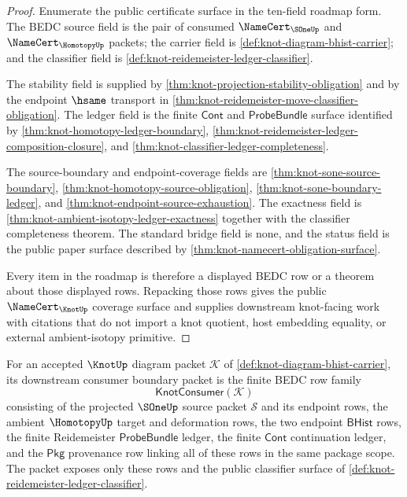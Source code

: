 \begin{proof}
Enumerate the public certificate surface in the ten-field roadmap form. The
BEDC source field is the pair of consumed $\NameCert_{\SOneUp}$ and
$\NameCert_{\HomotopyUp}$ packets; the carrier field is
\autoref{def:knot-diagram-bhist-carrier}; and the classifier field is
\autoref{def:knot-reidemeister-ledger-classifier}.

The stability field is supplied by
\autoref{thm:knot-projection-stability-obligation} and by the endpoint
$\hsame$ transport in
\autoref{thm:knot-reidemeister-move-classifier-obligation}. The ledger field
is the finite $\mathsf{Cont}$ and $\mathsf{ProbeBundle}$ surface identified by
\autoref{thm:knot-homotopy-ledger-boundary},
\autoref{thm:knot-reidemeister-ledger-composition-closure}, and
\autoref{thm:knot-classifier-ledger-completeness}.

The source-boundary and endpoint-coverage fields are
\autoref{thm:knot-sone-source-boundary},
\autoref{thm:knot-homotopy-source-obligation},
\autoref{thm:knot-sone-boundary-ledger}, and
\autoref{thm:knot-endpoint-source-exhaustion}. The exactness field is
\autoref{thm:knot-ambient-isotopy-ledger-exactness} together with the
classifier completeness theorem. The standard bridge field is none, and the
status field is the public paper surface described by
\autoref{thm:knot-namecert-obligation-surface}.

Every item in the roadmap is therefore a displayed BEDC row or a theorem
about those displayed rows. Repacking those rows gives the public
$\NameCert_{\KnotUp}$ coverage surface and supplies downstream knot-facing
work with citations that do not import a knot quotient, host embedding
equality, or external ambient-isotopy primitive.
\end{proof}

\begin{definition}\label{def:knot-consumer-boundary-packet}
For an accepted $\KnotUp$ diagram packet $\mathcal{K}$ of
\autoref{def:knot-diagram-bhist-carrier}, its downstream consumer boundary
packet is the finite BEDC row family
$$
\mathsf{KnotConsumer}(\mathcal{K})
$$
consisting of the projected $\SOneUp$ source packet $\mathcal{S}$ and its
endpoint rows, the ambient $\HomotopyUp$ target and deformation rows, the two
endpoint $\mathsf{BHist}$ rows, the finite Reidemeister
$\mathsf{ProbeBundle}$ ledger, the finite $\mathsf{Cont}$ continuation
ledger, and the $\mathsf{Pkg}$ provenance row linking all of these rows in the
same package scope. The packet exposes only these rows and the public
classifier surface of \autoref{def:knot-reidemeister-ledger-classifier}.
\end{definition}

